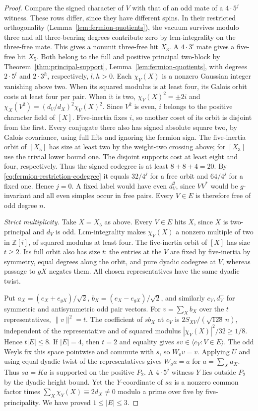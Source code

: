 \documentclass[11pt,a4paper]{article}
\numberwithin{equation}{section}
\theoremstyle{remark}
\newcommand{\ZZ}{\mathbb Z}
\begin{document}
\begin{proof}
Compare the signed character of $V$ with that of an odd mate of a
$4\cdot5^j$ witness. These rows differ, since they have different
spins. In their restricted orthogonality (Lemma~\ref{lem:fermion-quotients}), the vacuum
survives modulo three and all three-bearing degrees contribute zero
by lcm-integrality on the three-free mate. This gives a nonunit
three-free hit $X_3$. A $4\cdot3^i$ mate gives a five-free hit $X_5$.
Both belong to the full and positive principal two-block by
Theorem~\ref{thm:principal-support}, Lemma~\ref{lem:fermion-quotients}, with degrees $2\cdot5^l$ and
$2\cdot3^h$, respectively, $l,h>0$. Each $\chi_V(X)$ is a nonzero
Gaussian integer vanishing above two. When its squared modulus is
at least four, its Galois orbit costs at least four per pair. When
it is two, $\chi_V(X)^2=\pm2i$ and
$\chi_X(V^2)=(d_V/d_X)^2\chi_V(X)^2$. Since $V^2$ is even,
$i$ belongs to the positive character field of $[X]$. Five-inertia
fixes $i$, so another coset of its orbit is disjoint from the first.
Every conjugate there also has signed absolute square two, by
Galois covariance, using full lifts and ignoring the fermion sign.
The five-inertia orbit of $[X_5]$ has size at least two by the
weight-two crossing above; for $[X_3]$ use the trivial lower bound
one. The disjoint supports cost at least eight and four, respectively.
Thus the signed codegree is at least $8+8+4=20$. By \eqref{eq:fermion-restriction-codegree} it
equals $32/4^j$ for a free orbit and $64/4^j$ for a fixed one.
Hence $j=0$. A fixed label would have even $d_V^2$, since $VV^*$
would be $g$-invariant and all even simples occur in free pairs.
Every $V\in E$ is therefore free of odd degree $n$.

\smallskip\noindent\emph{Strict multiplicity.}
Take $X=X_5$ as above. Every $V\in E$ hits $X$, since $X$ is
two-principal and $d_V$ is odd. Lcm-integrality makes $\chi_V(X)$
a nonzero multiple of two in $\ZZ[i]$, of squared modulus at least
four. The five-inertia orbit of $[X]$ has size $t\ge2$. Its full
orbit also has size $t$: the entries at the $V$ are fixed by
five-inertia by symmetry, equal degrees along the orbit, and pure
dyadic codegree at $V$, whereas passage to $gX$ negates them.
All chosen representatives have the same dyadic twist.

Put $a_X=(e_X+e_{gX})/\sqrt2$, $b_X=(e_X-e_{gX})/\sqrt2$,
and similarly $c_V,d_V^-$ for symmetric and antisymmetric odd
pair vectors. For $v=\sum_X b_X$ over the $t$ representatives,
$\|v\|^2=t$. The coefficient of $s b_X$ at $c_V$ is
$2S_{XV}/(\sqrt{128}\,n)$, independent of the representative and
of squared modulus $|\chi_V(X)|^2/32\ge1/8$. Hence $t|E|\le8$.
If $|E|=4$, then $t=2$ and equality gives $sv\in\langle c_V:V\in
E\rangle$. The odd Weyls fix this space pointwise and commute with
$s$, so $W_o v=v$. Applying $U$ and using equal dyadic twist of
the representatives gives $W_o a=a$ for $a=\sum_X a_X$. Thus
$sa=Ka$ is supported on the positive $P_2$. A $4\cdot5^j$
witness $Y$ lies outside $P_2$ by the dyadic height bound. Yet
the $Y$-coordinate of $sa$ is a nonzero common factor times
$\sum_X\chi_Y(X)\equiv2d_X\ne0$ modulo a prime over five by
five-principality. We have proved $1\le |E|\le3$.


\end{proof}
\end{document}
